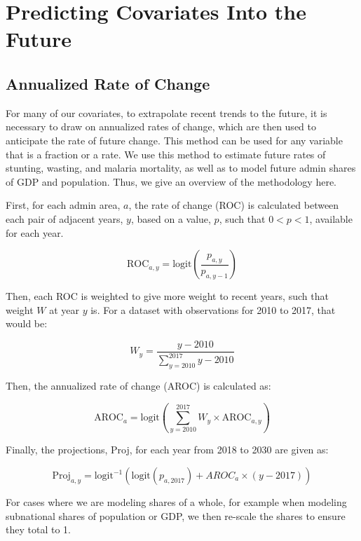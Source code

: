 \documentclass{article}
\begin{document}
\section{Predicting Covariates Into the Future}
\subsection{Annualized Rate of Change}
For many of our covariates, to extrapolate recent trends to the future, it is necessary to draw on annualized rates of change, which are then used to anticipate the rate of future change.  This method can be used for any variable that is a fraction or a rate.  We use this method to estimate future rates of stunting, wasting, and malaria mortality, as well as to model future admin shares of GDP and population.  Thus, we give an overview of the methodology here.

First, for each admin area, $a$, the rate of change (ROC) is calculated between each pair of adjacent years, $y$, based on a value, $p$, such that $0 < p < 1$, available for each year.

\begin{equation}
  \text{ROC}_{a,y} = \text{logit} \left( \frac{p_{a,y}}{p_{a,y-1}} \right)
  \label{eqn:a}
\end{equation}

Then, each ROC is weighted to give more weight to recent years, such that weight $W$ at year $y$ is.  For a dataset with observations for 2010 to 2017, that would be:

\begin{equation}
  W_y = \frac{y - 2010}{\sum_{y=2010}^{2017} y - 2010}
  \label{eqn:b}
\end{equation}

Then, the annualized rate of change (AROC) is calculated as:

\begin{equation}
  \text{AROC}_{a} = \text{logit} \left( \sum_{y=2010}^{2017} W_y \times \text{AROC}_{a, y} \right)
  \label{eqn:c}
\end{equation}

Finally, the projections, Proj, for each year from 2018 to 2030 are given as:

\begin{equation}
  \text{Proj}_{a,y} = \text{logit}^{-1} ( \text{logit} ( p_{a,2017} ) + AROC_{a} \times ( y - 2017 ) )
  \label{eqn:d}
\end{equation}

For cases where we are modeling shares of a whole, for example when modeling subnational shares of population or GDP, we then re-scale the shares to ensure they total to 1.
\end{document}

